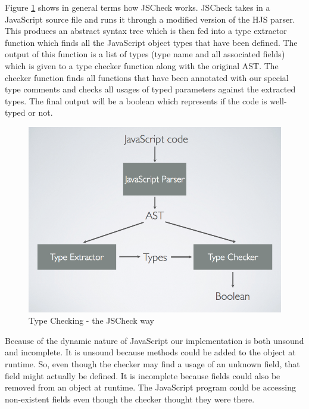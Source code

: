 \documentclass{article}
\begin{document}
Figure \ref{fig:jscheckway} shows in general terms how JSCheck works. JSCheck takes 
in a JavaScript source file and runs
it through a modified version of the HJS parser. This produces an abstract syntax tree
which is then fed into a type extractor function which finds all the JavaScript 
object types that
have been defined. The output of this function is a list of types 
(type name and all associated fields)
which is given to a type checker function along with the original AST. The
checker function finds all functions that have been annotated with our special
type comments and checks all usages of typed parameters against the extracted types.
The final 
output will be a boolean which represents if the code is well-typed or not. 

\begin{figure}[here]
  \begin{center}
    \includegraphics[scale=0.4]{blockdiagram.png}
  \end{center}
  \caption{Type Checking - the JSCheck way}
  \label{fig:jscheckway}
\end{figure}
\pagebreak

Because of the dynamic nature of JavaScript our implementation is both unsound 
and incomplete. It is unsound because methods could be added to the object at
runtime. So, even though the checker may find a usage of an unknown field, that field
might actually be defined. It is incomplete because fields could also be removed
from an object at runtime. The JavaScript program could be accessing non-existent 
fields even though the checker thought they were there.
\end{document}
